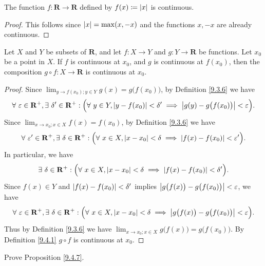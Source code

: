 \begin{proposition}\label{9.4.12}
    The function \(f : \mathbf{R} \to \mathbf{R}\) defined by \(f(x) \coloneqq \abs*{x}\) is continuous.
\end{proposition}

\begin{proof}
    This follows since \(\abs*{x} = \max(x, -x)\) and the functions \(x, -x\) are already continuous.
\end{proof}

\begin{proposition}\label{9.4.13}
    Let \(X\) and \(Y\) be subsets of \(\mathbf{R}\), and let \(f : X \to Y\) and \(g : Y \to \mathbf{R}\) be functions.
    Let \(x_0\) be a point in \(X\).
    If \(f\) is continuous at \(x_0\), and \(g\) is continuous at \(f(x_0)\), then the composition \(g \circ f : X \to \mathbf{R}\) is continuous at \(x_0\).
\end{proposition}

\begin{proof}
    Since \(\lim_{y \to f(x_0) ; y \in Y} g(x) = g\big(f(x_0)\big)\), by Definition \ref{9.3.6} we have
    \[
        \forall\ \varepsilon \in \mathbf{R}^+, \exists\ \delta' \in \mathbf{R}^+ : \Big(\forall\ y \in Y, \abs*{y - f(x_0)} < \delta' \implies \abs*{g(y) - g\big(f(x_0)\big)} < \varepsilon\Big).
    \]
    Since \(\lim_{x \to x_0 ; x \in X} f(x) = f(x_0)\), by Definition \ref{9.3.6} we have
    \[
        \forall\ \varepsilon' \in \mathbf{R}^+, \exists\ \delta \in \mathbf{R}^+ : \Big(\forall\ x \in X, \abs*{x - x_0} < \delta \implies \abs*{f(x) - f(x_0)} < \varepsilon'\Big).
    \]
    In particular, we have
    \[
        \exists\ \delta \in \mathbf{R}^+ : \Big(\forall\ x \in X, \abs*{x - x_0} < \delta \implies \abs*{f(x) - f(x_0)} < \delta'\Big).
    \]
    Since \(f(x) \in Y\) and \(\abs*{f(x) - f(x_0)} < \delta'\) implies \(\abs*{g\big(f(x)\big) - g\big(f(x_0)\big)} < \varepsilon\), we have
    \[
        \forall\ \varepsilon \in \mathbf{R}^+, \exists\ \delta \in \mathbf{R}^+ : \Big(\forall\ x \in X, \abs*{x - x_0} < \delta \implies \abs*{g\big(f(x)\big) - g\big(f(x_0)\big)} < \varepsilon\Big).
    \]
    Thus by Definition \ref{9.3.6} we have \(\lim_{x \to x_0 ; x \in X} g\big(f(x)\big) = g\big(f(x_0)\big)\).
    By Definition \ref{9.4.1} \(g \circ f\) is continuous at \(x_0\).
\end{proof}

\exercisesection

\begin{exercise}\label{ex 9.4.1}
    Prove Proposition \ref{9.4.7}.
\end{exercise}

